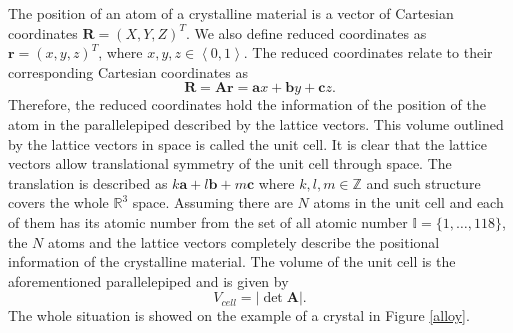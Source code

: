 \documentclass[11pt,oneside,czech,american]{book} %
\theoremstyle{definition} %
\theoremstyle{definition}
\begin{document}
The position of an atom of a crystalline material is a vector of Cartesian coordinates $\boldsymbol{R} = (X, Y, Z)^T$. We also define reduced coordinates as $\boldsymbol{r} = (x, y, z)^T$, where $x,y,z \in \left<0, 1\right>$. The reduced coordinates relate to their corresponding Cartesian coordinates as
\begin{equation}
	\boldsymbol{R} = \bm{A} \boldsymbol{r} = \boldsymbol{a} x + \boldsymbol{b} y + \boldsymbol{c} z.
\end{equation}
Therefore, the reduced coordinates hold the information of the position of the atom in the parallelepiped described by the lattice vectors. This volume outlined by the lattice vectors in space is called the unit cell. It is clear that the lattice vectors allow translational symmetry of the unit cell through space. The translation is described as $k \boldsymbol{a} + l \boldsymbol{b} + m \boldsymbol{c}$ where $k,l,m \in \mathbb{Z}$ and such structure covers the whole $\mathbb{R}^3$ space. Assuming there are $N$ atoms in the unit cell and each of them has its atomic number from the set of all atomic number $\mathbb{I} = \{1, \dots, 118\}$, the $N$ atoms and the lattice vectors completely describe the positional information of the crystalline material. The volume of the unit cell is the aforementioned parallelepiped and is given by
\begin{equation}
	V_{cell} = |\det \bm{A}|.
\end{equation}
The whole situation is showed on the example of a crystal in Figure \ref{alloy}.
\end{document}
